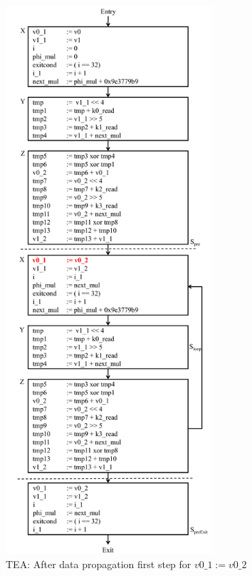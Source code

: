 \begin{figure}[H]
\begin{center}
\includegraphics[height=8in]{fig-proposal/tea-after-data-propagation1}
\caption{TEA: After data propagation first step for $v0\_1 := v0\_2$}
\label{fig:tea-after-data-propagation1}
\end{center}
\end{figure}

